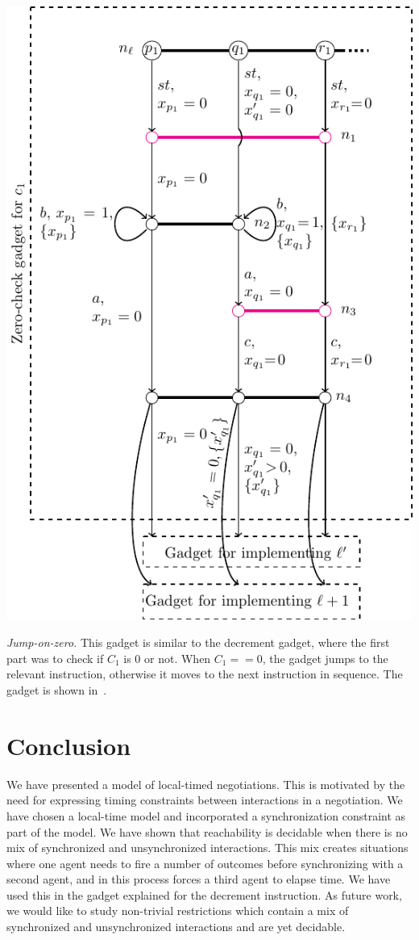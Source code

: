 \includegraphics{jump-gadget.pdf}

\noindent \emph{Jump-on-zero.} This gadget is similar to the decrement
gadget, where the first part was to check if $C_1$ is $0$ or not. When $C_1 == 0$, the gadget jumps to the
relevant instruction, otherwise it moves to the next instruction in
sequence. The gadget is shown in~\cite{mukund2023localtime}. 

\section{Conclusion}
\label{sec:conclusion}

We have presented a model of local-timed negotiations. This is
motivated by the need for expressing timing constraints between
interactions in a negotiation. We have chosen a local-time model and
incorporated a synchronization constraint as part of the model. We
have shown that reachability is decidable when there is no mix of
synchronized and unsynchronized interactions. This mix creates
situations where one agent needs to fire a number of outcomes before
synchronizing with a second agent, and in this process forces a third
agent to elapse time. We have used this in the gadget explained for
the decrement instruction. As future work, we would like to study
non-trivial restrictions which contain a mix of synchronized and
unsynchronized interactions and are yet decidable.

